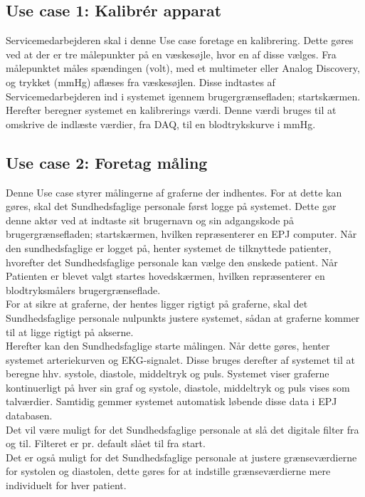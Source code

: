 \subsection{Use case 1: Kalibrér apparat}
Servicemedarbejderen skal i denne Use case foretage en kalibrering. Dette gøres ved at der er tre målepunkter på en væskesøjle, hvor en af disse vælges. Fra målepunktet måles spændingen (volt), med et multimeter eller Analog Discovery, og trykket (mmHg) aflæses fra væskesøjlen. Disse indtastes af Servicemedarbejderen ind i systemet igennem brugergrænsefladen; startskærmen. Herefter beregner systemet en kalibrerings værdi. Denne værdi bruges til at omskrive de indlæste værdier, fra DAQ, til en blodtrykskurve i mmHg.
\subsection{Use case 2: Foretag måling}
Denne Use case styrer målingerne af graferne der indhentes. For at dette kan gøres, skal det Sundhedsfaglige personale først logge på systemet. Dette gør denne aktør ved at indtaste sit brugernavn og sin adgangskode på brugergrænsefladen; startskærmen, hvilken repræsenterer en EPJ computer. Når den sundhedsfaglige er logget på, henter systemet de tilknyttede patienter, hvorefter det Sundhedsfaglige personale kan vælge den ønskede patient. Når Patienten er blevet valgt startes hovedskærmen, hvilken repræsenterer en blodtryksmålers brugergrænseflade. \\
For at sikre at graferne, der hentes ligger rigtigt på graferne, skal det Sundhedsfaglige personale nulpunkts justere systemet, sådan at graferne kommer til at ligge rigtigt på akserne.\\
Herefter kan den Sundhedsfaglige starte målingen. Når dette gøres, henter systemet arteriekurven og EKG-signalet. Disse bruges derefter af systemet til at beregne hhv. systole, diastole, middeltryk og puls. Systemet viser graferne kontinuerligt på hver sin graf og systole, diastole, middeltryk og puls vises som talværdier. Samtidig gemmer systemet automatisk løbende disse data i EPJ databasen. \\
Det vil være muligt for det Sundhedsfaglige personale at slå det digitale filter fra og til. Filteret er pr. default slået til fra start.\\
Det er også muligt for det Sundhedsfaglige personale at justere grænseværdierne for systolen og diastolen, dette gøres for at indstille grænseværdierne mere individuelt for hver patient.
